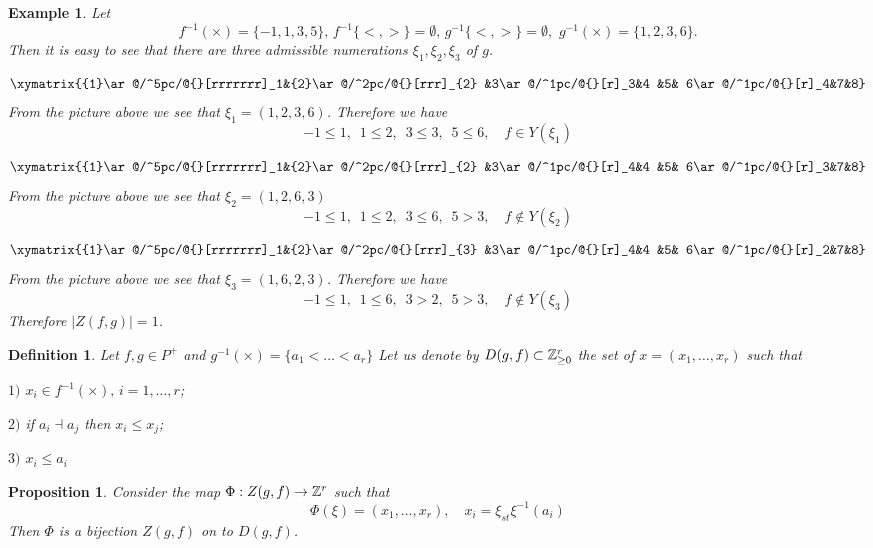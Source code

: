 \documentclass[12pt,reqno]{amsart}
\newtheorem{proposition}[thm]{Proposition}
\newtheorem{definition}[thm]{Definition}
\newtheorem{example}[thm]{Example}
\begin{document}
\begin{example}\label{adm0} 
 Let 
 $$
 f^{-1}(\times)=\{-1,1,3,5\}, \,f^{-1}\{<,>\}=\emptyset,\,g^{-1}\{<,>\}=\emptyset,\,\,g^{-1}(\times)=\{1,2,3,6\}.
 $$ 
 Then it is easy to see that there are  three  admissible numerations $\xi_1, \xi_2,\xi_3$ of $g$. 


\begin{equation}\label{adm1}
\xymatrix{{1}\ar@/^5pc/@{}[rrrrrrr]_1&{2}\ar@/^2pc/@{}[rrr]_{2} &3\ar@/^1pc/@{}[r]_3&4 &5& 6\ar@/^1pc/@{}[r]_4&7&8}
\end{equation}
\vskip0.5cm
From the picture  above we see  that $\xi_1=(1,2,3,6)$. Therefore we have
$$
-1\le 1,\,\,\,1\le2,\, \,\,3\le 3,\,\,\,  5\le 6,\quad  f\in Y(\xi_1)
$$ 




\begin{equation}\label{adm2}
\xymatrix{{1}\ar@/^5pc/@{}[rrrrrrr]_1&{2}\ar@/^2pc/@{}[rrr]_{2} &3\ar@/^1pc/@{}[r]_4&4 &5& 6\ar@/^1pc/@{}[r]_3&7&8}
\end{equation}
\vskip0.5cm
From the picture  above we see  that $\xi_2=(1,2,6,3)$
$$
-1\le 1,\,\,\,1\le2,\, \,\,3\le 6,\,\,\,  5> 3,\quad  f\notin Y(\xi_2)
$$ 


 

\begin{equation}\label{adm3}
\xymatrix{{1}\ar@/^5pc/@{}[rrrrrrr]_1&{2}\ar@/^2pc/@{}[rrr]_{3} &3\ar@/^1pc/@{}[r]_4&4 &5& 6\ar@/^1pc/@{}[r]_2&7&8}
\end{equation}
\vskip0.5cm
From the picture  above we see  that $\xi_3=(1,6,2,3)$. Therefore we have
$$
-1\le 1,\,\,\,1\le6,\, \,\,3> 2,\,\,\,  5> 3,\quad  f\notin Y(\xi_3)
$$ 
Therefore  $|Z(f,g)|=1$.
\end{example}
\begin{definition} Let $f,g\in P^+$
and $g^{-1}(\times)=\{a_1<\dots<a_r\}$  Let us denote by $D(g,f)\subset \Bbb Z_{\ge0}^r$ the set of $x=(x_1,\dots,x_r)$ such that  

 

$1)$ $x_i\in f^{-1}(\times),\,i=1,\dots,r $;


$2)$ if $a_i\dashv a_j$ then $x_i\le x_j$;

$3)$ $x_i\le a_i$



\end{definition} 
\begin{proposition}\label{biject} Consider the map $\Phi  :Z(g,f)\rightarrow \Bbb Z^r$ such that 
$$
\Phi(\xi)=(x_1,\dots,x_r),\quad x_i=\xi_{st}\xi^{-1}(a_i)
$$
 Then   $\Phi$ is a bijection   $Z(g,f)$ on to $D(g,f)$.  
\end{proposition}
\end{document}
